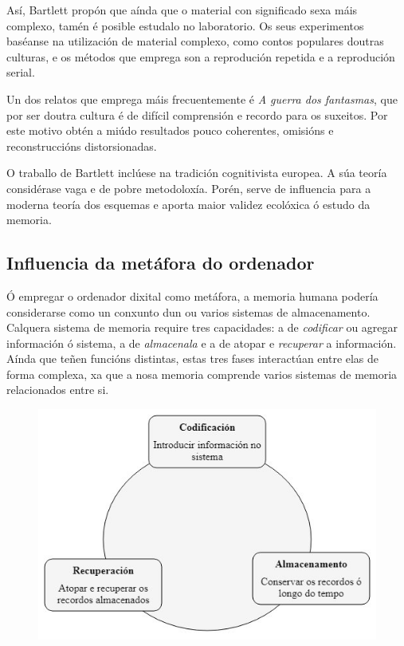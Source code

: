 \documentclass[a4paper,11pt]{article}
\begin{document}
Así, Bartlett propón que aínda que o material con significado sexa máis complexo, tamén é posible estudalo no laboratorio. Os seus experimentos baséanse na utilización de material complexo, como contos populares doutras culturas, e os métodos que emprega son a reprodución repetida e a reprodución serial.

Un dos relatos que emprega máis frecuentemente é \textit{A guerra dos fantasmas}, que por ser doutra cultura é de difícil comprensión e recordo para os suxeitos. Por este motivo obtén a miúdo resultados pouco coherentes, omisións e reconstruccións distorsionadas.

O traballo de Bartlett inclúese na tradición cognitivista europea. A súa teoría considérase vaga e de pobre metodoloxía. Porén, serve de influencia para a moderna teoría dos esquemas e aporta maior validez ecolóxica ó estudo da memoria.

\subsection{Influencia da metáfora do ordenador}
Ó empregar o ordenador dixital como metáfora, a memoria humana podería considerarse como un conxunto dun ou varios sistemas de almacenamento. Calquera sistema de memoria require	tres capacidades: a de \textit{codificar} ou agregar información ó sistema, a de \textit{almacenala} e a de atopar e \textit{recuperar} a información. Aínda que teñen funcións distintas, estas tres fases interactúan entre elas de forma complexa, xa que a nosa memoria comprende varios sistemas de memoria relacionados entre si.

\begin{figure}[h!]
	\centering
	\includegraphics[width=0.65\linewidth]{memoria1_1}
\end{figure}
\end{document}
